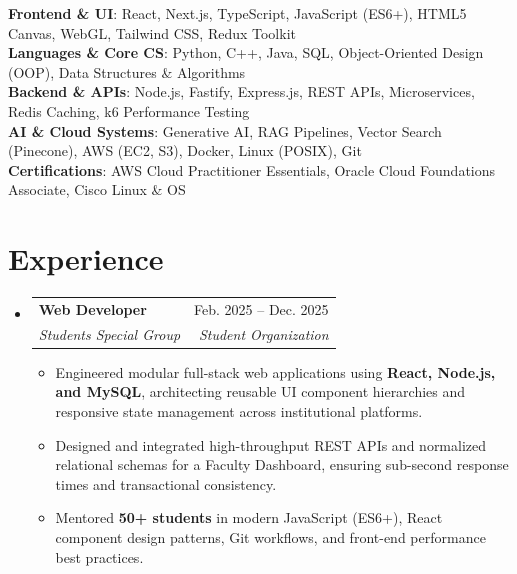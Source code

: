 \documentclass[letterpaper,10.5pt]{article}
\makeatletter
\newcommand{\resumeItem}[1]{
  \item\small{#1\vspace{-1pt}}
}
\newcommand{\resumeSubheading}[4]{
  \vspace{-1pt}\item
  \begin{tabular*}{0.97\textwidth}[t]{l@{\extracolsep{\fill}}r}
    \textbf{#1} & #2 \\
    \textit{\small#3} & \textit{\small#4} \\
  \end{tabular*}
  \vspace{-3pt}
}
\newcommand{\resumeSubHeadingListStart}{
\begin{itemize}[
    leftmargin=0.15in,
    label={},
    itemsep=2pt,
    parsep=0pt,
    topsep=3pt,
    partopsep=0pt
]
}
\newcommand{\resumeSubHeadingListEnd}{
\end{itemize}
\vspace{-2pt}
}
\newcommand{\resumeItemListStart}{
\begin{itemize}[
    itemsep=1pt,
    parsep=0pt,
    topsep=1pt,
    partopsep=0pt,
    leftmargin=0.18in
]
}
\newcommand{\resumeItemListEnd}{
\end{itemize}
\vspace{-2pt}
}
\makeatother
\begin{document}
\begin{itemize}[
    leftmargin=0.15in,
    label={},
    itemsep=1pt,
    parsep=0pt,
    topsep=1pt
]

\small{\item{
\textbf{Frontend \& UI}{: React, Next.js, TypeScript, JavaScript (ES6+), HTML5 Canvas, WebGL, Tailwind CSS, Redux Toolkit} \\
\textbf{Languages \& Core CS}{: Python, C++, Java, SQL, Object-Oriented Design (OOP), Data Structures \& Algorithms} \\
\textbf{Backend \& APIs}{: Node.js, Fastify, Express.js, REST APIs, Microservices, Redis Caching, k6 Performance Testing} \\
\textbf{AI \& Cloud Systems}{: Generative AI, RAG Pipelines, Vector Search (Pinecone), AWS (EC2, S3), Docker, Linux (POSIX), Git} \\
\textbf{Certifications}{: AWS Cloud Practitioner Essentials, Oracle Cloud Foundations Associate, Cisco Linux \& OS}
}}

\end{itemize}

\vspace{-5pt}

\section{Experience}

\resumeSubHeadingListStart

\resumeSubheading
{Web Developer}{Feb. 2025 -- Dec. 2025}
{Students Special Group}{Student Organization}

\resumeItemListStart

    \resumeItem{Engineered modular full-stack web applications using \textbf{React, Node.js, and MySQL}, architecting reusable UI component hierarchies and responsive state management across institutional platforms.}

    \resumeItem{Designed and integrated high-throughput REST APIs and normalized relational schemas for a Faculty Dashboard, ensuring sub-second response times and transactional consistency.}

    \resumeItem{Mentored \textbf{50+ students} in modern JavaScript (ES6+), React component design patterns, Git workflows, and front-end performance best practices.}

\resumeItemListEnd

\resumeSubHeadingListEnd
\end{document}
